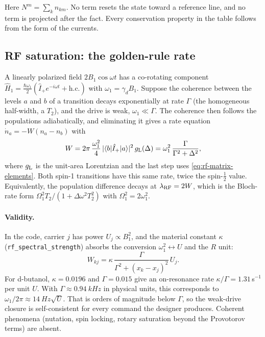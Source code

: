 \documentclass[11pt]{article}
\newcommand{\code}[1]{\texttt{#1}}
\begin{document}
Here \(N^m=\sum_kn_{km}\). No term resets the state toward a reference line, and no term is
projected after the fact. Every conservation property in the table follows from the form of the
currents.

\subsection{RF saturation: the golden-rule rate}
\label{sec:rf-golden}

A linearly polarized field \(2B_1\cos\omega t\) has a co-rotating component
\(\hat H_1=\tfrac{\hbar\omega_1}{2}(\hat I_+e^{-i\omega t}+\mathrm{h.c.})\) with
\(\omega_1=\gamma_dB_1\). Suppose the coherence between the levels \(a\) and \(b\) of a
transition decays exponentially at rate \(\Gamma\) (the homogeneous half-width, a \(T_2\)), and
the drive is weak, \(\omega_1\ll\Gamma\). The coherence then follows the populations
adiabatically, and eliminating it gives a rate equation
\(\dot n_a=-W(n_a-n_b)\) \cite{Bloch1946,Redfield1955,Abragam1961,Slichter1990} with
\begin{equation}
W = 2\pi\,\frac{\omega_1^2}{4}\,|\langle b|\hat I_+|a\rangle|^2\,g_{\rm L}(\Delta)
= \omega_1^2\,\frac{\Gamma}{\Gamma^2+\Delta^2},
\label{eq:Wgolden}
\end{equation}
where \(g_{\rm L}\) is the unit-area Lorentzian and the last step uses
\cref{eq:rf-matrix-elements}. Both spin-1 transitions have this same rate, twice the
spin-\(\tfrac12\) value. Equivalently, the population difference decays at
\(\lambda_{\rm RF}=2W\), which is the Bloch-rate form
\(\Omega_1^2T_2/(1+\Delta\omega^2T_2^2)\) with \(\Omega_1^2=2\omega_1^2\).

\paragraph{Validity.} In the code, carrier \(j\) has power \(U_j\propto B_1^2\), and the material
constant \(\kappa\) (\code{rf\_spectral\_strength}) absorbs the conversion
\(\omega_1^2\leftrightarrow U\) and the \(R\) unit:
\begin{equation}
W_{kj} = \kappa\,\frac{\Gamma}{\Gamma^2+(x_k-x_j)^2}\,U_j .
\label{eq:Wkj}
\end{equation}
For d-butanol, \(\kappa=0.0196\) and \(\Gamma=0.015\) give an on-resonance rate
\(\kappa/\Gamma=1.31\)\,s\(^{-1}\) per unit \(U\). With \(\Gamma\approx\SI{0.94}{kHz}\) in
physical units, this corresponds to \(\omega_1/2\pi\approx\SI{14}{Hz}\sqrt U\). That is orders of
magnitude below \(\Gamma\), so the weak-drive closure is self-consistent for every command the
designer produces. Coherent phenomena (nutation, spin locking, rotary saturation beyond the
Provotorov terms) are absent.
\end{document}
